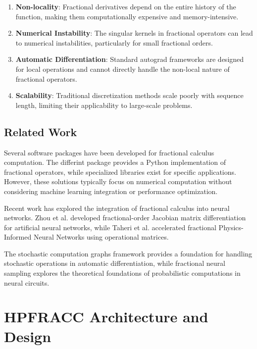 \documentclass[12pt]{article}
\begin{document}
\begin{enumerate}
\item \textbf{Non-locality}: Fractional derivatives depend on the entire history of the function, making them computationally expensive and memory-intensive.

\item \textbf{Numerical Instability}: The singular kernels in fractional operators can lead to numerical instabilities, particularly for small fractional orders.

\item \textbf{Automatic Differentiation}: Standard autograd frameworks are designed for local operations and cannot directly handle the non-local nature of fractional operators.

\item \textbf{Scalability}: Traditional discretization methods scale poorly with sequence length, limiting their applicability to large-scale problems.
\end{enumerate}

\subsection{Related Work}

Several software packages have been developed for fractional calculus computation. The differint package \cite{Adams2019DifferintPythonPackage} provides a Python implementation of fractional operators, while specialized libraries exist for specific applications. However, these solutions typically focus on numerical computation without considering machine learning integration or performance optimization.

Recent work has explored the integration of fractional calculus into neural networks. Zhou et al. \cite{Zhou2025FractionalOrderJacobianANN} developed fractional-order Jacobian matrix differentiation for artificial neural networks, while Taheri et al. \cite{Taheri2024AcceleratingFractionalPINNs} accelerated fractional Physics-Informed Neural Networks using operational matrices.

The stochastic computation graphs framework \cite{schulman2015gradient} provides a foundation for handling stochastic operations in automatic differentiation, while fractional neural sampling \cite{qi2022fractional} explores the theoretical foundations of probabilistic computations in neural circuits.

\section{HPFRACC Architecture and Design}
\end{document}

